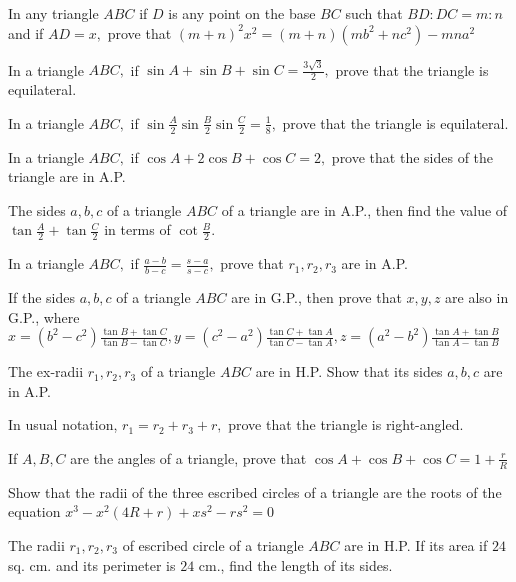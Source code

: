 \item In any triangle $ABC$ if $D$ is any point on the base $BC$ such that $BD:DC = m:n$ and if
     $AD=x,$ prove that $(m + n)^2x^2 = (m + n)(mb^2 + nc^2) - mna^2$

\item In a triangle $ABC,$ if $\sin A + \sin B + \sin C = \frac{3\sqrt{3}}{2},$ prove that the triangle is equilateral.

\item In a triangle $ABC,$ if $\sin\frac{A}{2}\sin\frac{B}{2}\sin\frac{C}{2} = \frac{1}{8},$ prove that the triangle is
     equilateral.

\item In a triangle $ABC,$ if $\cos A + 2\cos B + \cos C = 2,$ prove that the sides of the triangle are in A.P.

\item The sides $a, b, c$ of a triangle $ABC$ of a triangle are in A.P., then find the value of $\tan\frac{A}{2} +
   \tan\frac{C}{2}$ in terms of $\cot\frac{B}{2}.$

\item In a triangle $ABC,$ if $\frac{a - b}{b - c}= \frac{s - a}{s - c},$ prove that $r_1, r_2, r_3$ are in A.P.

\item If the sides $a, b, c$ of a triangle $ABC$ are in G.P., then prove that $x, y, z$ are also in G.P., where
   $x = (b^2 - c^2)\frac{\tan B + \tan C}{\tan B - \tan C}, y = (c^2 - a^2)\frac{\tan C + \tan A}{\tan C - \tan A}, z =
   (a^2 - b^2)\frac{\tan A + \tan B}{\tan A - \tan B}$

\item The ex-radii $r_1, r_2, r_3$ of a triangle $ABC$ are in H.P. Show that its sides $a, b, c$ are in A.P.

\item In usual notation, $r_1 = r_2 + r_3 + r,$ prove that the triangle is right-angled.

\item If $A, B, C$ are the angles of a triangle, prove that $\cos A + \cos B + \cos C = 1 + \frac{r}{R}$

\item Show that the radii of the three escribed circles of a triangle are the roots of the equation $x^3 - x^2(4R + r) + xs^2 -
   rs^2 = 0$

\item The radii $r_1, r_2, r_3$ of escribed circle of a triangle $ABC$ are in H.P. If its area if $24$ sq. cm. and
   its perimeter is $24$ cm., find the length of its sides.

